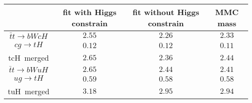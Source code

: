 
\centering
\begin{tabular}{cccc} \toprule\toprule
& fit with Higgs constrain  & fit without Higgs constrain & MMC mass\\\midrule
$\bar{t}t\to bWcH$ &    $2.55$  & $2.26$  & $2.33$       \\
$cg\to tH$ &            $0.12$  & $0.12$  & $0.11$       \\
tcH~merged &            $2.65$  & $2.36$  & $2.44$        \\
$\bar{t}t\to bWuH$ &    $2.65$  & $2.44$  & $2.41$         \\
$ug\to tH$ &            $0.59$  & $0.58$  & $0.58$         \\
tuH~merged &            $3.18$  & $2.95$  & $2.94$         \\
\bottomrule\bottomrule                  
\end{tabular}
